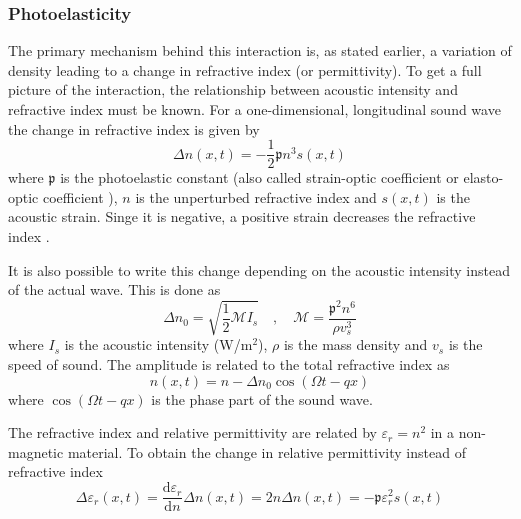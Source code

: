 \documentclass[10pt,a4paper,twocolumn,draft]{scrartcl}
\begin{document}
	\subsubsection{Photoelasticity}
	The primary mechanism behind this interaction is, as stated earlier, a variation of density leading to a change in refractive index (or permittivity). To get a full picture of the interaction, the relationship between acoustic intensity and refractive index must be known. For a one-dimensional, longitudinal sound wave the change in refractive index is given by \cite{Saleh2007}
	\begin{equation*}
		\Delta n (x,t) = -\frac{1}{2} \mathfrak{p} n^3 s(x,t)
	\end{equation*}
	where $\mathfrak{p}$ is the photoelastic constant (also called strain-optic coefficient or elasto-optic coefficient \cite{Korpel1988}), $n$ is the unperturbed refractive index and $s(x,t)$ is the acoustic strain. Singe it is negative, a positive strain decreases the refractive index \cite{Saleh2007}.
	
	It is also possible to write this change depending on the acoustic intensity instead of the actual wave. This is done as \cite{Saleh2007}
	\begin{equation*}
		\Delta n_0 = \sqrt{\frac{1}{2} \mathcal{M} I_s} \quad , \quad
		\mathcal{M} = \frac{\mathfrak{p}^2 n^6}{\rho v_s^3}
	\end{equation*}
	where $I_s$ is the acoustic intensity (W/m$^2$), $\rho$ is the mass density and $v_s$ is the speed of sound. The amplitude is related to the total refractive index as \cite{Saleh2007}
	\begin{equation*}
		n(x,t) = n - \Delta n_0 \cos(\Omega t - qx)
	\end{equation*}
	where $\cos(\Omega t - qx)$ is the phase part of the sound wave. 
	
	The refractive index and relative permittivity are related by $\varepsilon_r = n^2$ in a non-magnetic material. To obtain the change in relative permittivity instead of refractive index
	\begin{equation*}
		\Delta \varepsilon_r(x,t) = \frac{\mathrm{d}\varepsilon_r}{\mathrm{d}n} \Delta n(x,t) = 2n \Delta n(x,t) = -\mathfrak{p} \varepsilon_r^2 s(x,t)
	\end{equation*}
	
\end{document}
